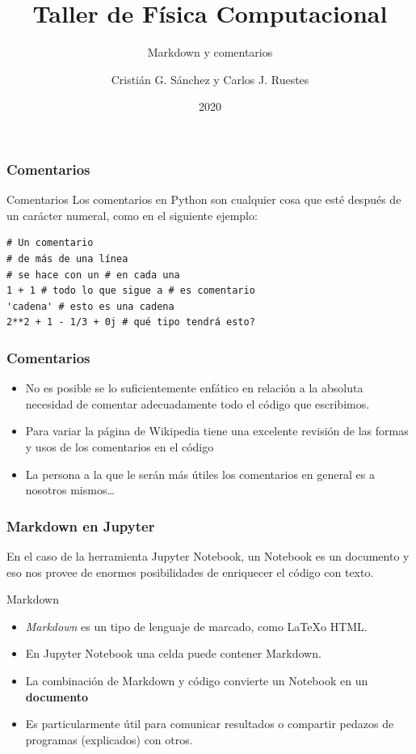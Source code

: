 \documentclass{beamer}
\title{Taller de Física Computacional}
\subtitle{Markdown y comentarios}
\author{Cristián G. Sánchez y Carlos J. Ruestes}
\date{2020}
\begin{document}
\frame{\titlepage}

\begin{frame}[fragile]
\frametitle{Comentarios}
\begin{block}{Comentarios}
Los comentarios en Python son cualquier cosa que esté después de un carácter numeral, como en el siguiente ejemplo:
\begin{verbatim}
# Un comentario
# de más de una línea
# se hace con un # en cada una
1 + 1 # todo lo que sigue a # es comentario
'cadena' # esto es una cadena
2**2 + 1 - 1/3 + 0j # qué tipo tendrá esto?
\end{verbatim}
\end{block}
\end{frame}

\begin{frame}[fragile]
\frametitle{Comentarios}
\begin{itemize}
\item No es posible se lo suficientemente enfático en relación a la \alert{absoluta} necesidad de comentar adecuadamente 
todo el código que escribimos.
\item Para variar la página de Wikipedia tiene una excelente revisión de las formas y usos de los comentarios en el código
\item La persona a la que le serán más útiles los comentarios en general es a nosotros mismos\ldots
\end{itemize}
\end{frame}

\begin{frame}[fragile]
\frametitle{Markdown en Jupyter}
En el caso de la herramienta Jupyter Notebook, un Notebook es un \alert{documento} y eso nos provee de enormes
posibilidades de enriquecer el código con texto.
\begin{block}{Markdown}
\begin{itemize}
\item {\em Markdown} es un tipo de lenguaje de marcado, como \LaTeX o HTML.
\item En Jupyter Notebook una celda puede contener Markdown.
\item La combinación de Markdown y código convierte un Notebook en un {\bf documento}
\item Es particularmente útil para comunicar resultados o compartir pedazos de programas (explicados) con otros.
\end{itemize}
\end{block}
\end{frame}
\end{document}
